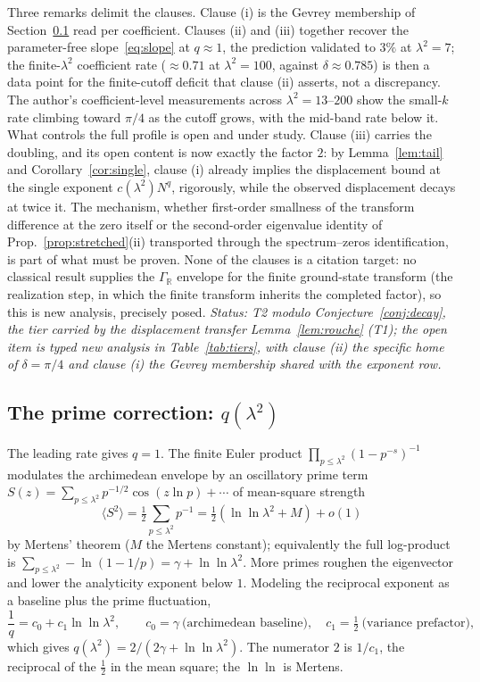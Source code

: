\documentclass[11pt,a4paper]{article}
\begin{document}
Three remarks delimit the clauses. Clause (i) is the Gevrey membership of
Section~\ref{ssec:prime} read per coefficient. Clauses (ii) and (iii) together
recover the parameter-free slope~\eqref{eq:slope} at $q\approx1$, the
prediction validated to $3\%$ at $\lambda^2=7$; the finite-$\lambda^2$
coefficient rate ($\approx0.71$ at $\lambda^2=100$, against
$\delta\approx0.785$) is then a data point for the finite-cutoff deficit
that clause (ii) asserts, not a discrepancy. The author's coefficient-level
measurements across $\lambda^2=13$--$200$ show the small-$k$ rate climbing
toward $\pi/4$ as the cutoff grows, with the mid-band rate below it. What
controls the full profile is open and under study. Clause (iii) carries the doubling, and its
open content is now exactly the factor $2$: by Lemma~\ref{lem:tail} and
Corollary~\ref{cor:single}, clause (i) already implies the displacement bound
at the single exponent $c(\lambda^2)N^{q}$, rigorously, while the observed
displacement decays at twice it. The mechanism, whether first-order
smallness of the transform difference at the zero itself or the second-order
eigenvalue identity of Prop.~\ref{prop:stretched}(ii) transported through the
spectrum--zeros identification, is part of what must be proven. None of the
clauses is a citation target: no classical result supplies the
$\Gamma_\mathbb{R}$ envelope for the finite ground-state transform (the
realization step, in which the finite transform inherits the completed
factor), so this is new analysis, precisely posed. \emph{Status: T2 modulo
Conjecture~\ref{conj:decay}, the tier carried by the displacement transfer
Lemma~\ref{lem:rouche} (T1); the open item is typed new analysis in
Table~\ref{tab:tiers}, with clause (ii) the specific home of $\delta=\pi/4$
and clause (i) the Gevrey membership shared with the exponent row.}

\subsection{The prime correction: $q(\lambda^2)$}\label{ssec:prime}

The leading rate gives $q=1$. The finite Euler product
$\prod_{p\le\lambda^2}(1-p^{-s})^{-1}$ modulates the archimedean envelope by an
oscillatory prime term $S(z)=\sum_{p\le\lambda^2}p^{-1/2}\cos(z\ln p)+\cdots$
of mean-square strength
\[
  \langle S^2\rangle=\tfrac12\sum_{p\le\lambda^2}p^{-1}
  =\tfrac12(\ln\ln\lambda^2+M)+o(1)
\]
by Mertens' theorem ($M$ the Mertens constant); equivalently the full
log-product is $\sum_{p\le\lambda^2}-\ln(1-1/p)=\gamma+\ln\ln\lambda^2$. More
primes roughen the eigenvector and lower the analyticity exponent below $1$.
Modeling the reciprocal exponent as a baseline plus the prime fluctuation,
\begin{equation}\label{eq:q}
  \frac1q = c_0+c_1\ln\ln\lambda^2,\qquad
  c_0=\gamma\ \text{(archimedean baseline)},\quad
  c_1=\tfrac12\ \text{(variance prefactor)},
\end{equation}
which gives $q(\lambda^2)=2/(2\gamma+\ln\ln\lambda^2)$. The numerator $2$ is
$1/c_1$, the reciprocal of the $\tfrac12$ in the mean square; the $\ln\ln$ is
Mertens.
\end{document}

